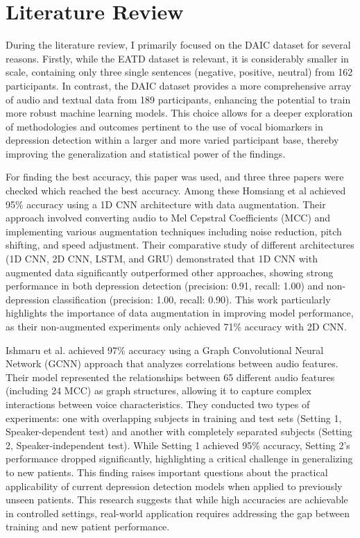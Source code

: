\section{Literature Review}
During the literature review, I primarily focused on the DAIC dataset for several reasons. Firstly, while the EATD dataset is relevant, it is considerably smaller in scale, containing only three single sentences (negative, positive, neutral) from 162 participants. In contrast, the DAIC dataset provides a more comprehensive array of audio and textual data from 189 participants, enhancing the potential to train more robust machine learning models. This choice allows for a deeper exploration of methodologies and outcomes pertinent to the use of vocal biomarkers in depression detection within a larger and more varied participant base, thereby improving the generalization and statistical power of the findings.

For finding the best accuracy, this paper\cite{liu2024diagnostic} was used, and three three papers were checked which reached the best accuracy. Among these Homsiang et al\cite{homsiang2022classification} achieved 95\% accuracy using a 1D CNN architecture with data augmentation. Their approach involved converting audio to Mel Cepstral Coefficients (MCC) and implementing various augmentation techniques including noise reduction, pitch shifting, and speed adjustment. Their comparative study of different architectures (1D CNN, 2D CNN, LSTM, and GRU) demonstrated that 1D CNN with augmented data significantly outperformed other approaches, showing strong performance in both depression detection (precision: 0.91, recall: 1.00) and non-depression classification (precision: 1.00, recall: 0.90). This work particularly highlights the importance of data augmentation in improving model performance, as their non-augmented experiments only achieved 71\% accuracy with 2D CNN.

Ishmaru et al. \cite{ishimaru2023classification} achieved 97\% accuracy using a Graph Convolutional Neural Network (GCNN) approach that analyzes correlations between audio features. Their model represented the relationships between 65 different audio features (including 24 MCC) as graph structures, allowing it to capture complex interactions between voice characteristics. They conducted two types of experiments: one with overlapping subjects in training and test sets (Setting 1, Speaker-dependent test) and another with completely separated subjects (Setting 2, Speaker-independent test). While Setting 1 achieved 95\% accuracy, Setting 2's performance dropped significantly, highlighting a critical challenge in generalizing to new patients. This finding raises important questions about the practical applicability of current depression detection models when applied to previously unseen patients. This research suggests that while high accuracies are achievable in controlled settings, real-world application requires addressing the gap between training and new patient performance.

